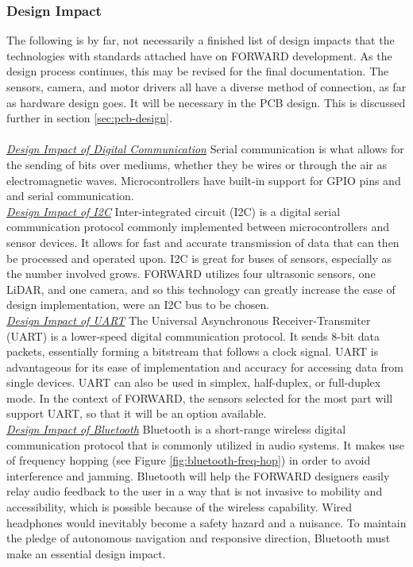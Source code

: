 \subsubsection{Design Impact}
\noindent The following is by far, not necessarily a finished list of design impacts that the technologies with standards attached have on FORWARD development. As the design process continues, this may be revised for the final documentation. The sensors, camera, and motor drivers all have a diverse method of connection, as far as hardware design goes. It will be necessary in the PCB design. This is discussed further in section \ref{sec:pcb-design}.\\\\


\noindent \underline{\textit{Design Impact of Digital Communication}}
Serial communication is what allows for the sending of bits over mediums, whether they be wires or through the air as electromagnetic waves. Microcontrollers have built-in support for GPIO pins and and serial communication.\\

\noindent \underline{\textit{Design Impact of I2C}}
Inter-integrated circuit (I2C) is a digital serial communication protocol commonly implemented between microcontrollers and sensor devices. It allows for fast and accurate transmission of data that can then be processed and operated upon. I2C is great for buses of sensors, especially as the number involved grows. FORWARD utilizes four ultrasonic sensors, one LiDAR, and one camera, and so this technology can greatly increase the ease of design implementation, were an I2C bus to be chosen.\\

\noindent \underline{\textit{Design Impact of UART}}
The Universal Asynchronous Receiver-Transmiter (UART) is a lower-speed digital communication protocol. It sends 8-bit data packets, essentially forming a bitstream that follows a clock signal. UART is advantageous for its ease of implementation and accuracy for accessing data from single devices. UART can also be used in simplex, half-duplex, or full-duplex mode. In the context of FORWARD, the sensors selected for the most part will support UART, so that it will be an option available.\\

\noindent \underline{\textit{Design Impact of Bluetooth}}
Bluetooth is a short-range wireless digital communication protocol that is commonly utilized in audio systems. It makes use of frequency hopping (see Figure \ref{fig:bluetooth-freq-hop}) in order to avoid interference and jamming. Bluetooth will help the FORWARD designers easily relay audio feedback to the user in a way that is not invasive to mobility and accessibility, which is possible because of the wireless capability. Wired headphones would inevitably become a safety hazard and a nuisance. To maintain the pledge of autonomous navigation and responsive direction, Bluetooth must make an essential design impact.\\

